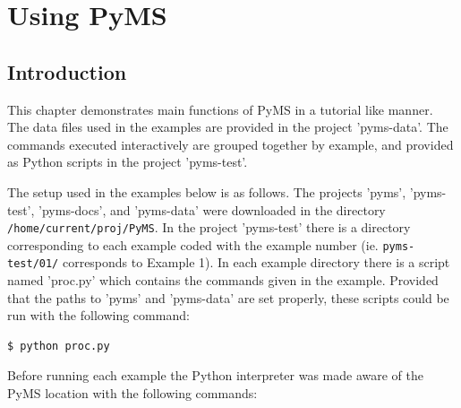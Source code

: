 

\chapter{Using PyMS}

\section{Introduction}

This chapter demonstrates main functions of PyMS in a tutorial like manner.
The data files used in the examples are provided in the project 'pyms-data'.
The commands executed interactively are grouped together by example, and
provided as Python scripts in the project 'pyms-test'.

The setup used in the examples below is as follows. The projects 'pyms',
'pyms-test', 'pyms-docs', and 'pyms-data' were downloaded in the directory
{\tt /home/current/proj/PyMS}. In the project 'pyms-test' there is a directory
corresponding to each example coded with the example number (ie.
{\tt pyms-test/01/} corresponds to Example 1). In each example directory
there is a script named 'proc.py' which contains the commands given in
the example. Provided that the paths to 'pyms' and 'pyms-data' are set
properly, these scripts could be run with the following command:

\begin{verbatim}
$ python proc.py
\end{verbatim}

Before running each example the Python interpreter was made aware of the
PyMS location with the following commands:

